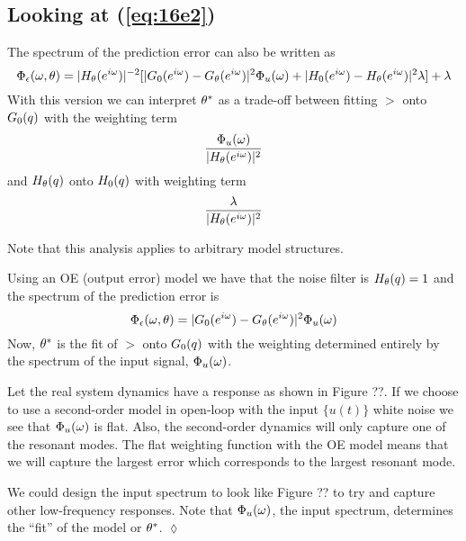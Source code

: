 \subsection{Looking at (\ref{eq:16e2})}
The spectrum of the prediction error can also be written as
$$\Phi_\epsilon(\omega,\theta) = |H_\theta(e^{i\omega})|^{-2}[|G_0(e^{i\omega})-G_\theta(e^{i\omega})|^2\Phi_u(\omega)+|H_0(e^{i\omega})-H_\theta(e^{i\omega})|^2\lambda]+\lambda$$
With this version we can interpret $\theta^\ast$ as a trade-off between fitting $\gt$ onto $G_0(q)$ with the weighting term
$$\frac{\Phi_u(\omega)}{|H_\theta(e^{i\omega})|^2}$$
and $H_\theta(q)$ onto $H_0(q)$ with weighting term
$$\frac{\lambda}{|H_\theta(e^{i\omega})|^2}$$

Note that this analysis applies to arbitrary model structures.

\begin{example}
Using an OE (output error) model we have that the noise filter is $H_\theta(q)=1$ and the spectrum of the prediction error is
$$\Phi_\epsilon(\omega,\theta) = |G_0(e^{i\omega})-G_\theta(e^{i\omega})|^2\Phi_u(\omega)$$
Now, $\theta^\ast$ is the fit of $\gt$ onto $G_0(q)$ with the weighting determined entirely by the spectrum of the input signal, $\Phi_u(\omega)$.

Let the real system dynamics have a response as shown in Figure ??. If we choose to use a second-order model in open-loop with the input $\{u(t)\}$ white noise we see that $\Phi_u(\omega)$ is flat. Also, the second-order dynamics will only capture one of the resonant modes. The flat weighting function with the OE model means that we will capture the largest error which corresponds to the largest resonant mode.

We could design the input spectrum to look like Figure ?? to try and capture other low-frequency responses. Note that $\Phi_u(\omega)$, the input spectrum, determines the ``fit'' of the model or $\theta^\ast$.
$\lozenge$
\end{example}

